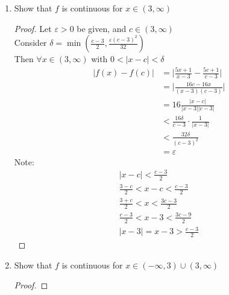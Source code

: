\documentclass[12pt]{article}
\begin{document}
\begin{enumerate}
\begin{enumerate}
\begin{proof}
\begin{align*}
                      |x-c| < 1 \\
                      -1 < x-c < 1 \\
                      c-1 < x < c+1 \\
                      c-4 < x-3 < c-2 \\
                      |x-3| = x-3 > c-4 && (c > 4)
                  \end{align*}
              \end{proof}'
              \item Show that $f$ is continuous for $x \in (3, \infty)$
              \begin{proof}
                  Let $\varepsilon > 0$ be given, and $c \in (3, \infty)$ \\
                  Consider $\delta = \min(\frac{c-3}{2}, \frac{\varepsilon{(c-3)}^2}{32})$ \\
                  Then $\forall x \in (3, \infty)$ with $0 < |x-c| < \delta$
                  \begin{align*}
                      |f(x) - f(c)| &= \bigg| \frac{5x+1}{x-3} - \frac{5c+1}{c-3} \bigg| \\
                      &= \bigg| \frac{16c-16x}{(x-3)(c-3)} \bigg| \\
                      &= 16\frac{|x-c|}{|x-3||c-3|} \\
                      &< \frac{16\delta}{c-3} \cdot \frac{1}{|x-3|} \\
                      &< \frac{32\delta}{{(c-3)}^2} \\
                      &= \varepsilon
                  \end{align*}
                  Note:
                  \begin{gather*}
                      |x-c| < \frac{c-3}{2} \\
                      \frac{3-c}{2} < x-c < \frac{c-3}{2} \\
                      \frac{3+c}{2} < x < \frac{3c-3}{2} \\
                      \frac{c-3}{2} < x-3 < \frac{3c-9}{2} \\
                      |x-3| = x-3 > \frac{c-3}{2}
                  \end{gather*}
              \end{proof}
              \item Show that $f$ is continuous for $x \in (-\infty, 3) \cup (3, \infty)$
              \begin{proof}

\end{proof}
\end{enumerate}
\end{enumerate}
\end{document}
